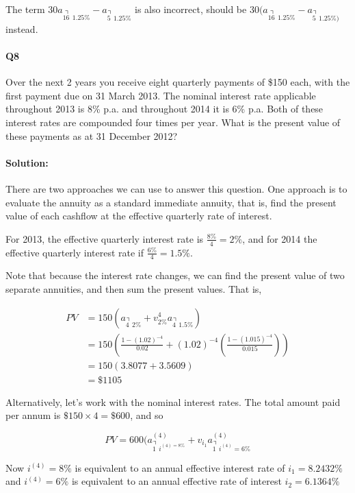 \documentclass[a4paper, 11pt, twoside]{article}
\begin{document}
The term $30a_{\annuity{16\ \ }1.25\%} - a_{\annuity{5\ \ }1.25\%}$ is also incorrect, should be $30(a_{\annuity{16\ \ }1.25\%} - a_{\annuity{5\ \ }1.25\%)}$ instead.\\

\paragraph{Q8} Over the next 2 years you receive eight quarterly payments of \$150 each, with the first payment due on 31 March 2013. The nominal interest rate applicable throughout 2013 is 8\% p.a. and throughout 2014 it is 6\% p.a. Both of these interest rates are compounded four times per year. What is the present value of these payments as at 31 December 2012?\\

\paragraph{Solution:} There are two approaches we can use to answer this question. One approach is to evaluate the annuity as a standard immediate annuity, that is, find the present value of each cashflow at the effective quarterly rate of interest.

For 2013, the effective quarterly interest rate is $\frac{8\%}{4}=2\%$, and for 2014 the effective quarterly interest rate if $\frac{6\%}{4}=1.5\%$.

Note that because the interest rate changes, we can find the present value of two separate annuities, and then sum the present values. That is,

\[\begin{split}
PV &= 150(a_{\annuity{4\ \ }2\%}+v^4_{2\%}a_{\annuity{4\ \ }1.5\%})\\
&=150\left(\frac{1-(1.02)^{-4}}{0.02}+(1.02)^{-4}\left(\frac{1-(1.015)^{-4}}{0.015}\right)\right)\\
&=150(3.8077+3.5609)\\
&=\$1105
\end{split}
\]

Alternatively, let's work with the nominal interest rates. The total amount paid per annum is $\$150\times 4=\$600$, and so

\[PV = 600(a^{(4)}_{\annuity{1\ \ }i^{(4)=8\%}}+ v_{i_1}a^{(4)}_{\annuity{1\ \ }i^{(4)}=6\%}\]

Now $i^{(4)}=8\%$ is equivalent to an annual effective interest rate of $i_1 = 8.2432\%$ and $i^{(4)}=6\%$ is equivalent to an annual effective rate of interest $i_2=6.1364\%$
\end{document}
